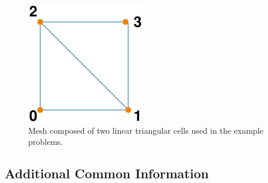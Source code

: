 \begin{figure}
\begin{centering}
\includegraphics{tutorials/twocells/figs/twotri3-mesh}
\par\end{centering}

\caption{Mesh composed of two linear triangular cells used in the example problems.\label{fig:twotri3-mesh}}
\end{figure}



\subsection{Additional Common Information}

